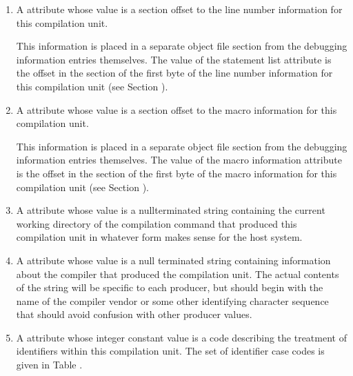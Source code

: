 \begin{enumerate}[1. ]
\item A \DWATstmtlist{}
attribute whose value is 
a 
section
\hypertarget{chap:DWATstmtlistlinenumberinformationforunit}{}
offset to the line number information for this compilation
unit.

This information is placed in a separate object file
section from the debugging information entries themselves. The
value of the statement list attribute is the offset in the
\dotdebugline{} section of the first byte of the line number
information for this compilation unit 
(see Section ).

\clearpage

\item A \DWATmacroinfo{} attribute 
whose value is a 
section
\hypertarget{chap:DWATmacroinfomacroinformation}{}
offset to the macro information for this compilation unit.

This information is placed in a separate object file section
from the debugging information entries themselves. The
value of the macro information attribute is the offset in
the \dotdebugmacinfo{} section of the first byte of the macro
information for this compilation unit 
(see Section ).

\item  A 
\DWATcompdir{} 
attribute 
\hypertarget{chap:DWATcompdircompilationdirectory}{}
whose value is a
null\dash terminated string containing the current working directory
of the compilation command that produced this compilation
unit in whatever form makes sense for the host system.

\item  A \DWATproducer{} attribute 
whose value is a null\dash
terminated string containing information about the compiler
\hypertarget{chap:DWATproducercompileridentification}{}
that produced the compilation unit. The actual contents of
the string will be specific to each producer, but should
begin with the name of the compiler vendor or some other
identifying character sequence that should avoid confusion
with other producer values.

\item  A \DWATidentifiercase{} 
attribute 
whose integer
\hypertarget{chap:DWATidentifiercaseidentifiercaserule}{}
constant value is a code describing the treatment
of identifiers within this compilation unit. The
set of identifier case codes is given in
Table .


\end{enumerate}
